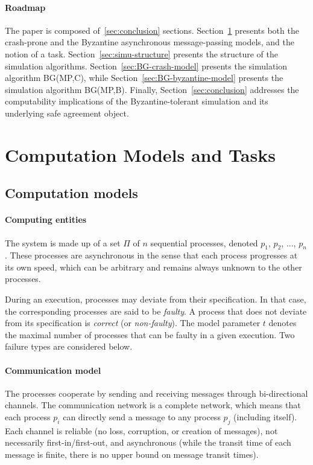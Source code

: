 \documentclass[11pt,letterpaper]{article}
\begin{document}
\paragraph{Roadmap}
The paper is composed of~\ref{sec:conclusion} sections.
Section~\ref{sec:model} presents both the crash-prone and the Byzantine
asynchronous message-passing models, and the notion of a task.
Section~\ref{sec:simu-structure} presents the structure of the simulation
algorithms. Section~\ref{sec:BG-crash-model} presents the  simulation
algorithm BG(MP,C), while Section~\ref{sec:BG-byzantine-model}
presents the simulation algorithm  BG(MP,B).
Finally, Section~\ref{sec:conclusion}  addresses 
the computability implications of the  Byzantine-tolerant 
simulation and its underlying safe agreement object. 


\section{Computation Models and Tasks}
\label{sec:model}

\subsection{Computation models}

\paragraph{Computing entities}
The system is made up of a set $\Pi$ of $n$ sequential processes,
denoted $p_1$, $p_2$, ..., $p_n$. These processes are asynchronous
in the sense that each process  progresses at  its own speed,
which can  be arbitrary and remains always unknown to the other processes.

During an execution, processes may deviate from their specification.
In that case, the corresponding processes are said to be {\it faulty}.
A process that does not deviate from its specification is {\it correct}
(or {\it non-faulty}).
The model parameter $t$ denotes the maximal number of processes that can
be faulty in a given execution. Two failure types are considered below.



\paragraph{Communication model}
The processes cooperate by sending and receiving messages through
bi-directional channels. The communication network is a complete network,
which means that each process $p_i$  can directly send a message to any
process $p_j$ (including itself).
Each channel is reliable (no loss, corruption, or creation of messages),
not necessarily first-in/first-out, and asynchronous (while the transit
time of each message is finite,  there is no upper bound on message
transit times).
\end{document}
